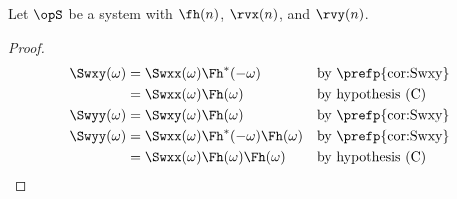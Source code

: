 




















\begin{corollary}
\label{cor:Swxy}
Let $\opS$ be a system with  $\fh(n)$,
 $\rvx(n)$, and  $\rvy(n)$.
\end{corollary}
\begin{proof}
\begin{align*}
   \Swxy(\omega)
     &= \Swxx(\omega) \Fh^\ast(-\omega)
     && \text{by \prefp{cor:Swxy}}
   \\&= \Swxx(\omega) \Fh(\omega)
     && \text{by hypothesis (C)}
   \\
   \Swyy(\omega)
     &= \Swxy(\omega) \Fh(\omega)
     && \text{by \prefp{cor:Swxy}}
   \\
   \Swyy(\omega)
     &= \Swxx(\omega) \Fh^\ast(-\omega) \Fh(\omega)
     && \text{by \prefp{cor:Swxy}}
   \\&= \Swxx(\omega) \Fh(\omega) \Fh(\omega)
     && \text{by hypothesis (C)}
\end{align*}
\end{proof}


